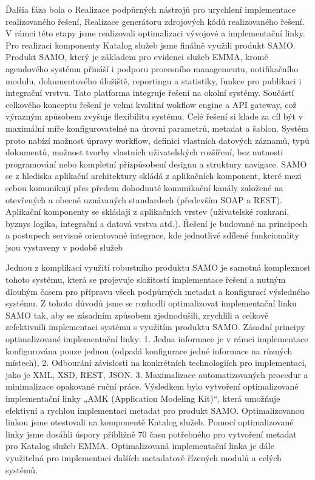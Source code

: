 Ďalšia fáza bola o Realizace podpůrných nástrojů pro urychlení implementace realizovaného řešení, Realizace generátoru zdrojových kódů realizovaného řešení. V rámci této etapy jsme realizovali optimalizaci vývojové a implementační linky. Pro realizaci komponenty 
Katalog služeb jsme finálně využili produkt SAMO. 
Produkt SAMO, který je základem pro evidenci služeb EMMA, kromě agendového systému přináší i 
podporu procesního managementu, notifikačního modulu, dokumentového úložiště, reportingu a 
statistiky, funkce pro publikaci i integrační vrstvu. Tato platforma integruje řešení na okolní systémy. 
Součástí celkového konceptu řešení je velmi kvalitní wokflow engine a API gateway, což výrazným 
způsobem zvyšuje flexibilitu systému. Celé řešení si klade za cíl být v maximální míře konfigurovatelné na 
úrovni parametrů, metadat a šablon. Systém proto nabízí možnost úpravy workflow, definici vlastních 
datových záznamů, typů dokumentů, možnost tvorby vlastních uživatelských rozšíření, bez nutnosti 
programování nebo kompletní přizpůsobení designu a struktury navigace. SAMO se z hlediska aplikační 
architektury skládá z aplikačních komponent, které mezi sebou komunikují přes předem dohodnuté 
komunikační kanály založené na otevřených a obecně uznávaných standardech (především SOAP a REST). 
Aplikační komponenty se skládají z aplikačních vrstev (uživatelské rozhraní, byznys logika, integrační a 
datová vrstva atd.). Řešení je budované na principech a postupech servisně orientované integrace, kde 
jednotlivé sdílené funkcionality jsou vystaveny v podobě služeb

Jednou z komplikací využití robustního produktu SAMO je samotná komplexnost tohoto systému, která se 
projevuje složitostí implementace řešení a nutným dlouhým časem pro přípravu všech podpůrných 
metadat a konfigurací výsledného systému. Z tohoto důvodů jsme se rozhodli optimalizovat 
implementační linku SAMO tak, aby se zásadním způsobem zjednodušili, zrychlili a celkově zefektivnili 
implementaci systému s využitím produktu SAMO. Zásadní principy optimalizované implementační linky:
1. Jedna informace je v rámci implementace konfigurována pouze jednou (odpadá konfigurace 
jedné informace na různých místech),
2. Odbourání závislosti na konkrétních technologiích pro implementaci, jako je XML, XSD, REST,
JSON.
3. Maximalizace automatizovaných procedur a minimalizace opakované ruční práce. 
Výsledkem bylo vytvoření optimalizované implementační linky „AMK (Application Modeling Kit)“, která 
umožňuje efektivní a rychlou implementaci metadat pro produkt SAMO. Optimalizovanou linkou jsme 
otestovali na komponentě Katalog služeb. Pomocí optimalizované linky jsme dosáhli úspory přibližně 70%
času potřebného pro vytvoření metadat pro Katalog služeb EMMA. Optimalizovaná implementační linka 
je dále využitelná pro implementaci dalších metadatově řízených modulů a celých systémů. 

